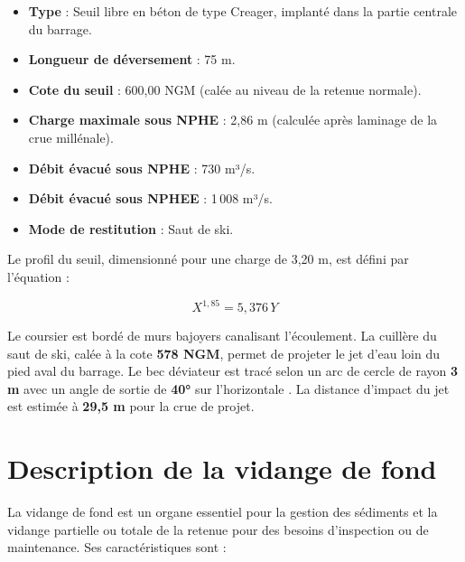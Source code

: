 \begin{itemize}
    \item \textbf{Type} : Seuil libre en béton de type Creager, implanté dans la partie centrale du barrage.
    \item \textbf{Longueur de déversement} : 75 m.
    \item \textbf{Cote du seuil} : 600,00 NGM (calée au niveau de la retenue normale).
    \item \textbf{Charge maximale sous NPHE} : 2,86 m (calculée après laminage de la crue millénale).
    \item \textbf{Débit évacué sous NPHE} : 730 m³/s.
    \item \textbf{Débit évacué sous NPHEE} : 1\,008 m³/s.
    \item \textbf{Mode de restitution} : Saut de ski.
\end{itemize}

Le profil du seuil, dimensionné pour une charge de 3,20 m, est défini par l'équation \cite{note_calcul_evacuateur} :

\begin{equation}
X^{1,85} = 5{,}376\,Y
\label{eq:profil_creager}
\end{equation}

Le coursier est bordé de murs bajoyers canalisant l'écoulement. La cuillère du saut de ski, calée à la cote \textbf{578 NGM}, permet de projeter le jet d'eau loin du pied aval du barrage. Le bec déviateur est tracé selon un arc de cercle de rayon \textbf{3 m} avec un angle de sortie de \textbf{40°} sur l'horizontale \cite{note_calcul_evacuateur}. La distance d'impact du jet est estimée à \textbf{29,5 m} pour la crue de projet.

\section{Description de la vidange de fond}
\label{sec:vidange_fond}

La vidange de fond est un organe essentiel pour la gestion des sédiments et la vidange partielle ou totale de la retenue pour des besoins d'inspection ou de maintenance. Ses caractéristiques sont \cite{fiche_organes_restitution, note_calcul_vidange} :

